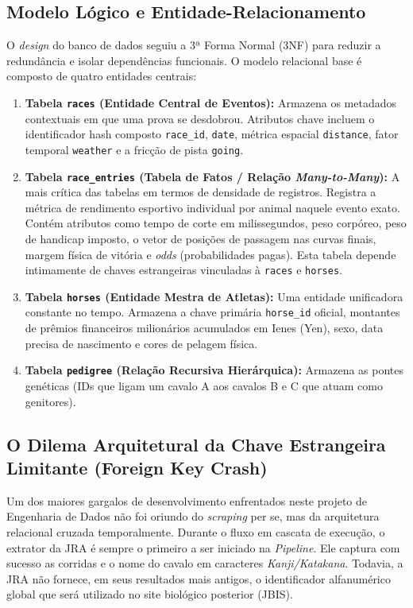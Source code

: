 \documentclass[12pt,a4paper]{article}
\begin{document}
\subsection{Modelo Lógico e Entidade-Relacionamento}
O \textit{design} do banco de dados seguiu a 3ª Forma Normal (3NF) para reduzir a redundância e isolar dependências funcionais. O modelo relacional base é composto de quatro entidades centrais:
\begin{enumerate}
    \item \textbf{Tabela \texttt{races} (Entidade Central de Eventos):}
    Armazena os metadados contextuais em que uma prova se desdobrou. Atributos chave incluem o identificador hash composto \texttt{race\_id}, \texttt{date}, métrica espacial \texttt{distance}, fator temporal \texttt{weather} e a fricção de pista \texttt{going}.
    \item \textbf{Tabela \texttt{race\_entries} (Tabela de Fatos / Relação \textit{Many-to-Many}):}
    A mais crítica das tabelas em termos de densidade de registros. Registra a métrica de rendimento esportivo individual por animal naquele evento exato. Contém atributos como tempo de corte em milissegundos, peso corpóreo, peso de handicap imposto, o vetor de posições de passagem nas curvas finais, margem física de vitória e \textit{odds} (probabilidades pagas). Esta tabela depende intimamente de chaves estrangeiras vinculadas à \texttt{races} e \texttt{horses}.
    \item \textbf{Tabela \texttt{horses} (Entidade Mestra de Atletas):}
    Uma entidade unificadora constante no tempo. Armazena a chave primária \texttt{horse\_id} oficial, montantes de prêmios financeiros milionários acumulados em Ienes (Yen), sexo, data precisa de nascimento e cores de pelagem física.
    \item \textbf{Tabela \texttt{pedigree} (Relação Recursiva Hierárquica):}
    Armazena as pontes genéticas (IDs que ligam um cavalo A aos cavalos B e C que atuam como genitores).
\end{enumerate}

\subsection{O Dilema Arquitetural da Chave Estrangeira Limitante (Foreign Key Crash)}
Um dos maiores gargalos de desenvolvimento enfrentados neste projeto de Engenharia de Dados não foi oriundo do \textit{scraping} per se, mas da arquitetura relacional cruzada temporalmente.
Durante o fluxo em cascata de execução, o extrator da JRA é sempre o primeiro a ser iniciado na \textit{Pipeline}. Ele captura com sucesso as corridas e o nome do cavalo em caracteres \textit{Kanji/Katakana}. Todavia, a JRA não fornece, em seus resultados mais antigos, o identificador alfanumérico global que será utilizado no site biológico posterior (JBIS).
\end{document}
